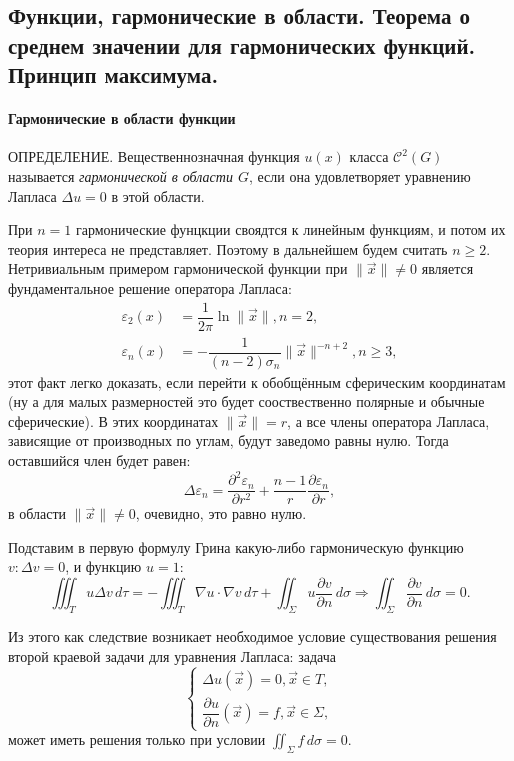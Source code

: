 \subsection{Функции, гармонические в области. Теорема о среднем значении для гармонических
функций. Принцип максимума.}

\paragraph{Гармонические в области функции}
ОПРЕДЕЛЕНИЕ. Вещественнозначная функция $u(x)$ класса $\mathcal{C}^2 (G)$ называется 
\emph{гармонической в области $G$}, если она удовлетворяет уравнению Лапласа $\Delta u = 0$
в этой области.

При $n=1$ гармонические фунцкции своядтся к линейным функциям, и потом их теория интереса
не представляет. Поэтому в дальнейшем будем считать $n \geqslant 2$. Нетривиальным примером
гармонической функции при $\| \vec{x} \| \neq 0$ является фундаментальное решение оператора
Лапласа:
\begin{align*}
  \varepsilon_2 (x) &= \dfrac{1}{2\pi} \ln \| \vec{x} \|, n = 2, \\
  \varepsilon_n (x) &= - \dfrac{1}{(n-2) \sigma_n} \| \vec{x} \|^{-n+2}, n \geqslant 3,
\end{align*}
этот факт легко доказать, если перейти к обобщённым сферическим координатам (ну а для малых
размерностей это будет сооствественно полярные и обычные сферические). В этих координатах
$\| \vec{x} \| = r$, а все члены оператора Лапласа, зависящие от производных по углам, будут
заведомо равны нулю. Тогда оставшийся член будет равен:
\[
  \Delta \varepsilon_n = 
  \dfrac{\partial^2 \varepsilon_n}{\partial r^2} 
  + \dfrac{n-1}{r} \dfrac{\partial \varepsilon_n}{\partial r}, 
\]
в области $\|\vec{x}\| \neq 0$, очевидно, это равно нулю.

Подставим в первую формулу Грина какую-либо гармоническую функцию $v : \Delta v = 0$, и функцию 
$u = 1$:
\[
  \iiint_T u \Delta v \, d\tau = - \iiint_T \nabla u \cdot \nabla v \, d\tau
    + \iint_\Sigma u \dfrac{\partial v}{\partial n} \, d\sigma
  \Rightarrow
  \iint_\Sigma \dfrac{\partial v}{\partial n} \, d\sigma = 0.
\]

Из этого как следствие возникает необходимое условие существования решения второй краевой задачи
для уравнения Лапласа: задача
\[
  \begin{cases}
    \Delta u(\vec{x}) = 0, \vec{x} \in T, \\
    \dfrac{\partial u}{\partial n} (\vec{x}) = f, \vec{x} \in \Sigma,
  \end{cases}
\]
может иметь решения только при условии $\iint_\Sigma f \, d\sigma = 0$.

